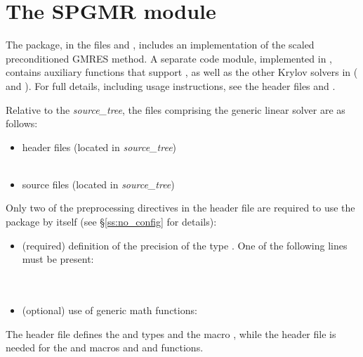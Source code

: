 
\section{The SPGMR module}\label{ss:spgmr}

The {\spgmr} package, in the files  and , includes an
implementation of the scaled preconditioned GMRES method.  
A separate code module, implemented in , contains auxiliary
functions that support {\spgmr}, as well as the other Krylov solvers in {\sundials}
({\spbcg} and {\sptfqmr}).
For full details, including usage instructions, see the header
files  and .

Relative to the {\sundials} {\em source\_tree}, the files comprising the
{\spgmr} generic linear solver are as follows:
\begin{itemize}
\item header files (located in {\em source\_tree})\\
     \\
     
\item source files (located in {\em source\_tree})\\
    
\end{itemize}
Only two of the preprocessing directives in the header file  
are required to use the {\spgmr} package by itself (see \S\ref{ss:no_config} for details):
\begin{itemize}
\item (required) definition of the precision of the {\sundials} type . 
  One of the following lines must be present:\\
  \\
  \\
\item (optional) use of generic math functions:\\
\end{itemize}
The  header file defines the {\sundials}
 and  types and the macro , while the 
 header file is needed for the  and  macros 
and  and  functions.

